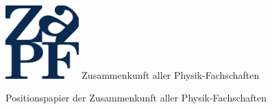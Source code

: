 \documentclass[DIV=calc]{scrartcl}
\begin{document}
    \hspace{0.87\textwidth}
    \begin{minipage}{120pt}
        \vspace{-1.8cm}
        \includegraphics[width=80pt]{../../logo.pdf}
        \centering
        \small Zusammenkunft aller Physik-Fachschaften
    \end{minipage}
    \begin{center}
        \huge{Positionspapier der Zusammenkunft aller Physik-Fachschaften}\vspace{.25\baselineskip}\\
        \normalsize
    \end{center}
    \vspace{1cm} 
\end{document}
